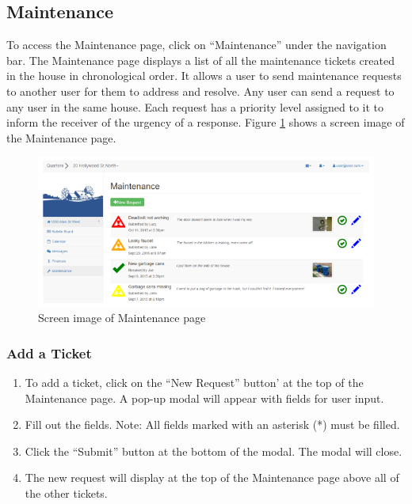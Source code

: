 \documentclass[12pt]{article}
\begin{document}
    \subsection{Maintenance}
    To access the Maintenance page, click on ``Maintenance'' under the navigation bar. The Maintenance page displays a list of all the maintenance tickets created in the house in chronological order. It  allows a user to send maintenance requests to another user for them to address and resolve. Any user can send a request to any user in the same house. Each request has a priority level assigned to it to inform the receiver of the urgency of a response. Figure \ref{fig:maintenance} shows a screen image of the Maintenance page.

    \begin{figure}
        \centering
        \includegraphics[width=\textwidth]{maintenance}
        \caption{Screen image of Maintenance page}
        \label{fig:maintenance}
    \end{figure}

    \subsubsection{Add a Ticket}
    \begin{enumerate}
        \item To add a ticket, click on the ``New Request'' button' at the top of the Maintenance page. A pop-up modal will appear with fields for user input.
        \item Fill out the fields. Note: All fields marked with an asterisk (*) must be filled.
        \item Click the ``Submit'' button at the bottom of the modal. The modal will close.
        \item The new request will display at the top of the Maintenance page above all of the other tickets.
    \end{enumerate}
\end{document}
